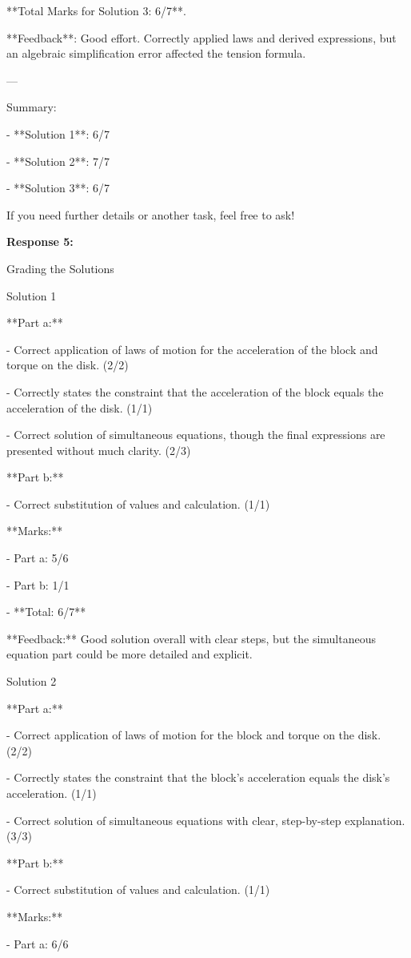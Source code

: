 \documentclass[a4paper,11pt]{article}
\begin{document}
**Total Marks for Solution 3: 6/7**.

**Feedback**: Good effort. Correctly applied laws and derived expressions, but an algebraic simplification error affected the tension formula.

---

Summary:

- **Solution 1**: 6/7

- **Solution 2**: 7/7

- **Solution 3**: 6/7

If you need further details or another task, feel free to ask!

\bigskip
\textbf{Response 5:}

Grading the Solutions

Solution 1

**Part a:**

- Correct application of laws of motion for the acceleration of the block and torque on the disk. (2/2)

- Correctly states the constraint that the acceleration of the block equals the acceleration of the disk. (1/1)

- Correct solution of simultaneous equations, though the final expressions are presented without much clarity. (2/3)

**Part b:**

- Correct substitution of values and calculation. (1/1)

**Marks:**

- Part a: 5/6

- Part b: 1/1

- **Total: 6/7**

**Feedback:** Good solution overall with clear steps, but the simultaneous equation part could be more detailed and explicit.

Solution 2

**Part a:**

- Correct application of laws of motion for the block and torque on the disk. (2/2)

- Correctly states the constraint that the block's acceleration equals the disk's acceleration. (1/1)

- Correct solution of simultaneous equations with clear, step-by-step explanation. (3/3)

**Part b:**

- Correct substitution of values and calculation. (1/1)

**Marks:**

- Part a: 6/6
\end{document}

